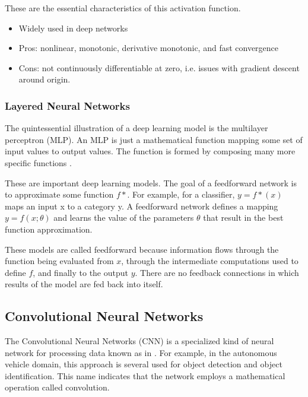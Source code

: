These are the essential characteristics of this activation function.

    \begin{itemize}
        \item Widely used in deep networks
        \item Pros: nonlinear, monotonic, derivative monotonic, and fast convergence
        \item Cons: not continuously differentiable at zero, i.e. issues with gradient descent around origin.
    \end{itemize}

\subsubsection{Layered Neural Networks}

The quintessential illustration of a deep learning model is the multilayer perceptron (MLP). An MLP is just a mathematical function mapping some set of input values to output values. The function
is formed by composing many more specific functions \cite{goodfellow2016deep}.


These are important deep learning models. The goal
of a feedforward network is to approximate some function $f*$. For example, for a classifier, $y = f*(x)$ maps an input x to a category y. A feedforward network
defines a mapping $y = f (x; \theta)$ and learns the value of the parameters $\theta$ that result in the best function approximation.

These models are called feedforward because information flows through the function being evaluated from $x$, through the intermediate computations used to define $f$, and finally to the output $y$. There are no feedback connections in which results of the model are fed back into itself.



\subsection{Convolutional Neural Networks}\label{sec:cnn}


The Convolutional Neural Networks (CNN) is a specialized kind of neural network for processing data known as in \cite{lecun1995convolutional}. For example, in the autonomous vehicle domain, this approach is several used for object detection and object identification. This name  indicates that the network employs a mathematical operation called
convolution. 

